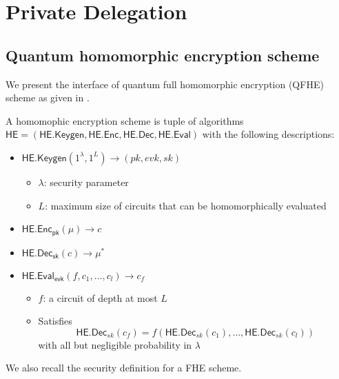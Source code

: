 \section{Private Delegation}


\subsection{Quantum homomorphic encryption scheme}


We present the interface of quantum full homomorphic encryption (QFHE) scheme as given in \cite{mahadev_qfhe}.

\begin{dfn}
	A homomophic encryption scheme is tuple of algorithms $\mathsf{HE}=(\mathsf{HE.Keygen}, \mathsf{HE.Enc}, \mathsf{HE.Dec}, \mathsf{HE.Eval})$ with the following descriptions:
	\begin{itemize}
		\item $\mathsf{HE.Keygen}(1^\lambda, 1^L)\rightarrow(pk, evk, sk)$
			\begin{itemize}
				\item $\lambda$: security parameter
				\item $L$: maximum size of circuits that can be homomorphically evaluated
			\end{itemize}
		\item $\mathsf{HE.Enc_{pk}}(\mu)\rightarrow c$
		\item $\mathsf{HE.Dec_{sk}}(c)\rightarrow \mu^*$
		\item $\mathsf{HE.Eval_{evk}}(f, c_1, \ldots, c_l)\rightarrow c_f$
			\begin{itemize}
				\item $f$: a circuit of depth at most $L$
				\item Satisfies $$\mathsf{HE.Dec}_{sk}(c_f)=f(\mathsf{HE.Dec}_{sk}(c_1),\ldots,\mathsf{HE.Dec}_{sk}(c_l))$$ with all but negligible probability in $\lambda$
			\end{itemize}
	\end{itemize}
\end{dfn}

We also recall the security definition for a FHE scheme.

